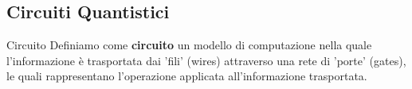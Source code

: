 \subsection{Circuiti Quantistici}
\begin{definition}{Circuito}{}
    Definiamo come \textbf{circuito} un modello di computazione nella quale l'informazione
    è trasportata dai 'fili' (wires) attraverso una rete di 'porte' (gates), le quali rappresentano
    l'operazione applicata all'informazione trasportata.
\end{definition}